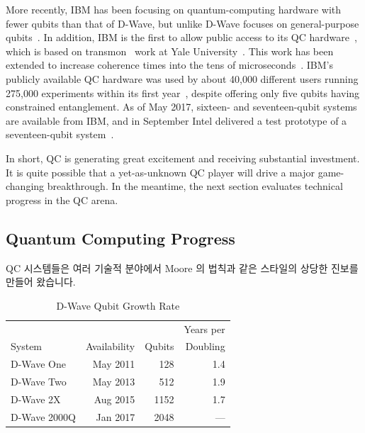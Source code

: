 More recently, IBM has been focusing on quantum-computing hardware with
fewer qubits than that of D-Wave, but unlike D-Wave focuses on
general-purpose
qubits~\cite{BradJones2017IBM-QC-Announce,RobertHackett2017IBM-QC-Announce,AgamShah2017IBM-QC-50-qubit,DarioGill2017IBM-Universal-QC}.
In addition, IBM is the first to allow public access to its QC
hardware~\cite{IBM2016QuantumExperience,ArsTechnica2016IBMQuantumExperience,MikeVizard2017IBM-QC-Cloud},
which is based on transmon~\cite{WikipediaTransMon} work at
Yale University~\cite{PhysRevA.76.042319}.
This work has been extended
to increase coherence times into the tens of
microseconds~\cite{PhysRevLett.107.240501,PhysRevLett.111.080502,PhysRevB.86.100506}.
IBM's publicly available QC hardware was used by about 40,000 different
users running 275,000 experiments within its first
year~\cite{SeanMichaelKerner2017IBM-QC-API},
despite offering only five qubits having constrained entanglement.
As of May 2017, sixteen- and seventeen-qubit systems are available
from IBM, and in September Intel delivered a test prototype of
a seventeen-qubit system~\cite{Intel2017delivers17qubit}.

In short, QC is generating great excitement and receiving substantial
investment.
It is quite possible that a yet-as-unknown QC player will drive a
major game-changing breakthrough.
In the meantime, the next section evaluates technical progress in the
QC arena.
\fi

\subsection{Quantum Computing Progress}
\label{sec:future:Quantum Computing Progress}

QC 시스템들은 여러 기술적 분야에서 Moore 의 법칙과 같은 스타일의 상당한 진보를
만들어 왔습니다.

\begin{table}
\centering\footnotesize
\begin{tabular}{l|r|r|r}
	&	&	& Years per \\
System
	& Availability
		& Qubits
			& Doubling \\
\hline
\hline
D-Wave One
	& May 2011
		& 128
			& 1.4 \\
\hline
D-Wave Two
	& May 2013
		& 512
			& 1.9 \\
\hline
D-Wave 2X
	& Aug 2015
		& 1152
			& 1.7 \\
\hline
D-Wave 2000Q
	& Jan 2017
		& 2048
			& --- \\
\end{tabular}
\caption{D-Wave Qubit Growth Rate}
\label{tab:future:D-Wave Qubit Growth Rate}
\end{table}

